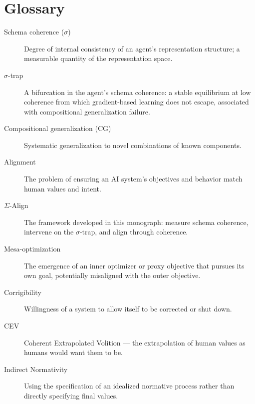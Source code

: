 \chapter*{Glossary}

\begin{description}
  \item[Schema coherence ($\sigma$)] Degree of internal consistency of an agent's representation
    structure; a measurable quantity of the representation space.
  \item[$\sigma$-trap] A bifurcation in the agent's schema coherence: a stable equilibrium at low
    coherence from which gradient-based learning does not escape, associated with compositional
    generalization failure.
  \item[Compositional generalization (CG)] Systematic generalization to novel combinations of
    known components.
  \item[Alignment] The problem of ensuring an AI system's objectives and behavior match human
    values and intent.
  \item[$\Sigma$-Align] The framework developed in this monograph: measure schema coherence,
    intervene on the $\sigma$-trap, and align through coherence.
  \item[Mesa-optimization] The emergence of an inner optimizer or proxy objective that pursues its
    own goal, potentially misaligned with the outer objective.
  \item[Corrigibility] Willingness of a system to allow itself to be corrected or shut down.
  \item[CEV] Coherent Extrapolated Volition — the extrapolation of human values as humans would
    want them to be.
  \item[Indirect Normativity] Using the specification of an idealized normative process rather than
    directly specifying final values.
\end{description}

